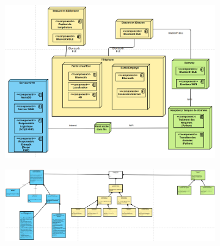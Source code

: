 \documentclass[10pt,a4paper]{book}
\begin{document}
\begin{figure}[h!]
    \centering
    \begin{subfigure}[b]{0.45\textwidth}
        \centering
        \includegraphics[scale=0.14]{Images/diagramme_deploiement.png}
        \caption{}
        \label{diagramme_deploiement}
    \end{subfigure}
    \begin{subfigure}[b]{0.45\textwidth}
        \includegraphics[scale=0.14]{Images/diagramme_exigence1.png}
        \caption{}
        \label{diagramme_exigences1}
    \end{subfigure}
    \caption{}
\end{figure}
\end{document}
